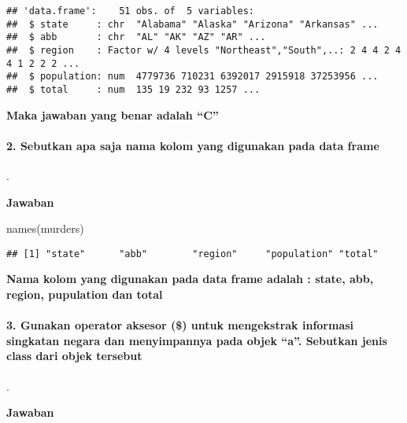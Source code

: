 \documentclass[
]{article}
\newenvironment{Shaded}{\begin{snugshade}}{\end{snugshade}}
\newcommand{\FunctionTok}[1]{\textcolor[rgb]{0.00,0.00,0.00}{#1}}
\newcommand{\NormalTok}[1]{#1}
\newcommand{\OtherTok}[1]{\textcolor[rgb]{0.56,0.35,0.01}{#1}}
\newcommand{\SpecialCharTok}[1]{\textcolor[rgb]{0.00,0.00,0.00}{#1}}
\begin{document}
\begin{verbatim}
## 'data.frame':    51 obs. of  5 variables:
##  $ state     : chr  "Alabama" "Alaska" "Arizona" "Arkansas" ...
##  $ abb       : chr  "AL" "AK" "AZ" "AR" ...
##  $ region    : Factor w/ 4 levels "Northeast","South",..: 2 4 4 2 4 4 1 2 2 2 ...
##  $ population: num  4779736 710231 6392017 2915918 37253956 ...
##  $ total     : num  135 19 232 93 1257 ...
\end{verbatim}

\textbf{Maka jawaban yang benar adalah ``C'' }

\hypertarget{sebutkan-apa-saja-nama-kolom-yang-digunakan-pada-data-frame}{%
\paragraph{2. Sebutkan apa saja nama kolom yang digunakan pada data
frame}\label{sebutkan-apa-saja-nama-kolom-yang-digunakan-pada-data-frame}}

.

\textbf{Jawaban}

\begin{Shaded}
\begin{Highlighting}[]
\FunctionTok{names}\NormalTok{(murders)}
\end{Highlighting}
\end{Shaded}

\begin{verbatim}
## [1] "state"      "abb"        "region"     "population" "total"
\end{verbatim}

\textbf{Nama kolom yang digunakan pada data frame adalah : state, abb,
region, pupulation dan total}

\hypertarget{gunakan-operator-aksesor-untuk-mengekstrak-informasi-singkatan-negara-dan-menyimpannya-pada-objek-a.-sebutkan-jenis-class-dari-objek-tersebut}{%
\paragraph{3. Gunakan operator aksesor (\$) untuk mengekstrak informasi
singkatan negara dan menyimpannya pada objek ``a''. Sebutkan jenis class
dari objek
tersebut}\label{gunakan-operator-aksesor-untuk-mengekstrak-informasi-singkatan-negara-dan-menyimpannya-pada-objek-a.-sebutkan-jenis-class-dari-objek-tersebut}}

.

\textbf{Jawaban}

\begin{Shaded}
\end{Shaded}
\end{document}
